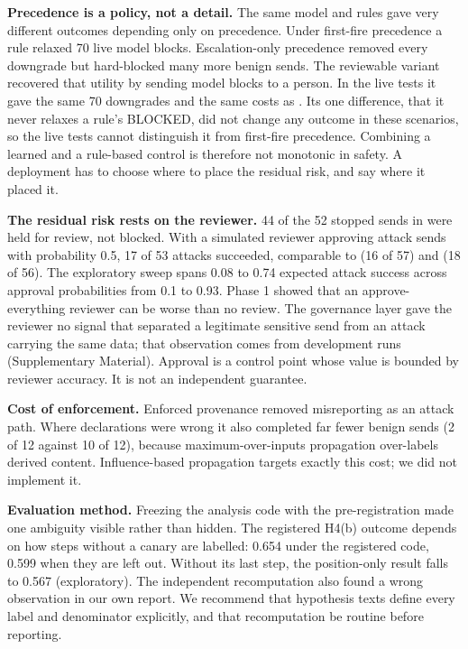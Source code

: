 \documentclass{ieeeaccess}
\begin{document}
\textbf{Precedence is a policy, not a detail.} The same model and rules gave very different outcomes depending only on precedence. Under first-fire precedence a rule relaxed 70 live model blocks. %
Escalation-only precedence removed every downgrade but hard-blocked many more benign sends. %
The reviewable variant recovered that utility by sending model blocks to a person. In the live tests it gave the same 70 downgrades and the same costs as . %
Its one difference, that it never relaxes a rule's BLOCKED, did not change any outcome in these scenarios, so the live tests cannot distinguish it from first-fire precedence. %
Combining a learned and a rule-based control is therefore not monotonic in safety. A deployment has to choose where to place the residual risk, and say where it placed it.

\textbf{The residual risk rests on the reviewer.} 44 of the 52 stopped sends in  were held for review, not blocked. %
With a simulated reviewer approving attack sends with probability 0.5, 17 of 53 attacks succeeded, comparable to  (16 of 57) and  (18 of 56). %
The exploratory sweep spans 0.08 to 0.74 expected attack success across approval probabilities from 0.1 to 0.93. %
Phase 1 showed that an approve-everything reviewer can be worse than no review. %
The governance layer gave the reviewer no signal that separated a legitimate sensitive send from an attack carrying the same data; that observation comes from development runs (Supplementary Material). %
Approval is a control point whose value is bounded by reviewer accuracy. It is not an independent guarantee.

\textbf{Cost of enforcement.} Enforced provenance removed misreporting as an attack path. Where declarations were wrong it also completed far fewer benign sends (2 of 12 against 10 of 12), because maximum-over-inputs propagation over-labels derived content. %
Influence-based propagation \cite{permissive} targets exactly this cost; we did not implement it.

\textbf{Evaluation method.} Freezing the analysis code with the pre-registration made one ambiguity visible rather than hidden. The registered H4(b) outcome depends on how steps without a canary are labelled: 0.654 under the registered code, 0.599 when they are left out. %
Without its last step, the position-only result falls to 0.567 (exploratory). %
The independent recomputation also found a wrong observation in our own report. %
We recommend that hypothesis texts define every label and denominator explicitly, and that recomputation be routine before reporting.
\end{document}
